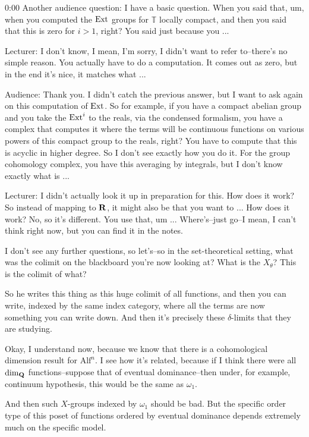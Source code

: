 \begin{unfinished}{0:00}
Another audience question: I have a basic question. When you said that, um, when you computed the $\operatorname{Ext}$ groups for $\mathbb{T}$ locally compact, and then you said that this is zero for $i > 1$, right? You said just because you ...

Lecturer: I don't know, I mean, I'm sorry, I didn't want to refer to--there's no simple reason. You actually have to do a computation. It comes out as zero, but in the end it's nice, it matches what ...

Audience: Thank you. I didn't catch the previous answer, but I want to ask again on this computation of $\operatorname{Ext}$. So for example, if you have a compact abelian group and you take the $\operatorname{Ext}^i$ to the reals, via the condensed formalism, you have a complex that computes it where the terms will be continuous functions on various powers of this compact group to the reals, right? You have to compute that this is acyclic in higher degree. So I don't see exactly how you do it. For the group cohomology complex, you have this averaging by integrals, but I don't know exactly what is ...

Lecturer: I didn't actually look it up in preparation for this. How does it work? So instead of mapping to $\mathbf R$, it might also be that you want to ... How does it work? No, so it's different. You use that, um ...
Where's--just go--I mean, I can't think right now, but you can find it in the notes.

I don't see any further questions, so let's--so in the set-theoretical setting, what was the colimit on the blackboard you're now looking at? What is the $X_\theta$? This is the colimit of what?

So he writes this thing as this huge colimit of all functions, and then you can write, indexed by the same index category, where all the terms are now something you can write down. And then it's precisely these $\delta$-limits that they are studying.

Okay, I understand now, because we know that there is a cohomological dimension result for $\mathrm{Alf}^n$. I see how it's related, because if I think there were all $\dim_\mathbf Q$ functions--suppose that of eventual dominance--then under, for example, continuum hypothesis, this would be the same as $\omega_1$.

And then such $X$-groups indexed by $\omega_1$ should be bad. But the specific order type of this poset of functions ordered by eventual dominance depends extremely much on the specific model.

\end{unfinished}